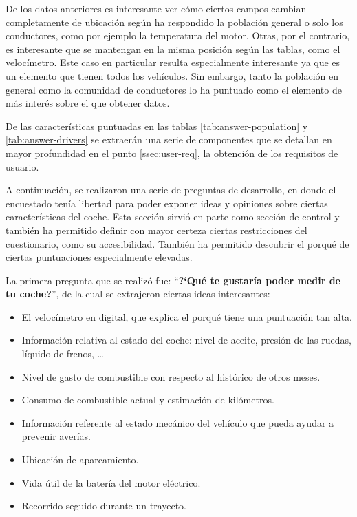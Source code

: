 De los datos anteriores es interesante ver cómo ciertos campos cambian completamente
de ubicación según ha respondido la población general o solo los conductores, como por
ejemplo la temperatura del motor. Otras, por el contrario, es interesante que se mantengan
en la misma posición según las tablas, como el velocímetro. Este caso en particular
resulta especialmente interesante ya que es un elemento que tienen todos los vehículos.
Sin embargo, tanto la población en general como la comunidad de conductores lo ha
puntuado como el elemento de más interés sobre el que obtener datos.

De las características puntuadas en las tablas \ref{tab:answer-population} y \ref{tab:answer-drivers}
se extraerán una serie de componentes que se detallan en mayor profundidad en el
punto \ref{ssec:user-req}, la obtención de los requisitos de usuario.

A continuación, se realizaron una serie de preguntas de desarrollo, en donde el
encuestado tenía libertad para poder exponer ideas y opiniones sobre ciertas
características del coche. Esta sección sirvió en parte como sección de control
y también ha permitido definir con mayor certeza ciertas restricciones del cuestionario,
como su accesibilidad. También ha permitido descubrir el porqué de ciertas puntuaciones
especialmente elevadas.

La primera pregunta que se realizó fue: ``\textbf{?`Qué te gustaría poder medir de tu coche?}'',
de la cual se extrajeron ciertas ideas interesantes:

\begin{itemize}
  \item El velocímetro en digital, que explica el porqué tiene una puntuación tan alta.
  \item Información relativa al estado del coche: nivel de aceite, presión de las ruedas, líquido de frenos, \dots
  \item Nivel de gasto de combustible con respecto al histórico de otros meses.
  \item Consumo de combustible actual y estimación de kilómetros.
  \item Información referente al estado mecánico del vehículo que pueda ayudar a prevenir averías.
  \item Ubicación de aparcamiento.
  \item Vida útil de la batería del motor eléctrico.
  \item Recorrido seguido durante un trayecto.
\end{itemize}

